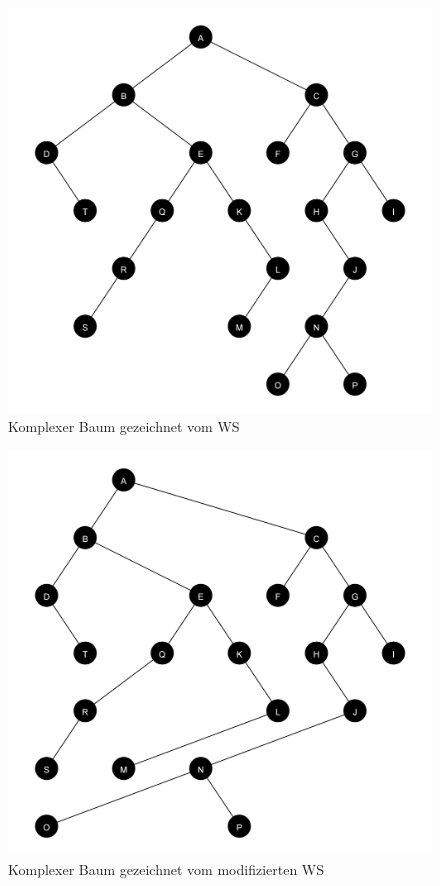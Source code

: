 \begin{figure}[ht]
    \centering
    \includegraphics[scale = 0.12]{abbildungen/komplex_a2}
    \caption{Komplexer Baum gezeichnet vom \ac{WS}}
    \label{pic:komplex_a2}
\end{figure}

\begin{figure}[ht]
    \centering
    \includegraphics[scale = 0.12]{abbildungen/komplex_a2_v}
    \caption{Komplexer Baum gezeichnet vom modifizierten \ac{WS}}
    \label{pic:komplex_a2v}
\end{figure}

